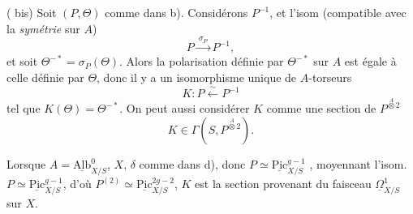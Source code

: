 \documentclass[11pt,a4paper]{article}
\begin{document}
 ( bis) Soit $(P, \Theta)$ comme dans b).
Considérons  $P^{-1}$, et l'isom (compatible
avec la \emph{symétrie} sur $A$)
\[
  P \xrightarrow{\ \sigma_P\ } P^{-1} ,
\]
et soit $\Theta^{-*} = \sigma_P(\Theta)$. Alors la polarisation définie par
$\Theta^{-*}$ sur $A$ est égale à celle définie par $\Theta$, donc il y a un
isomorphisme unique de $A$-torseurs
\[
  K : P \xleftarrow{\ \sim\ } P^{-1}
\]
tel que $K(\Theta) = \Theta^{-*}$. On peut aussi considérer $K$ comme une
section de $P^{\overset{A}{\otimes} 2}$
\[
  K \in \Gamma(S, P^{\overset{A}{\otimes} 2}) .
\]

Lorsque $A = \underline{\mathrm{Alb}}^{0}_{X/S}$, $X$, $\delta$ comme dans
d), donc $P \simeq \underline{\mathrm{Pic}}^{g-1}_{X/S}$ ,  moyennant l'isom.\ $P \simeq
\underline{\mathrm{Pic}}^{g-1}_{X/S}$, d'où $P^{(2)} \simeq
\underline{\mathrm{Pic}}^{2g-2}_{X/S}$, $K$ est la section provenant du
\struck{\ill{}} faisceau $\underline{\Omega}^{1}_{X/S}$ sur
$X$.

\end{document}

